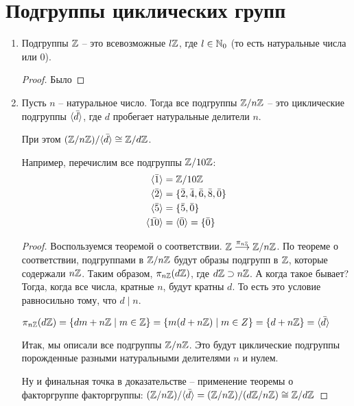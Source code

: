 \section{Подгруппы циклических групп}
\begin{enumerate}
    \item Подгруппы $\mathbb{Z}$ -- это всевозможные $l \mathbb{Z}$, где $l \in \mathbb{N}_0$ (то есть натуральные числа или 0). 
    \begin{proof}
        Было
    \end{proof}
    \item Пусть $n$ -- натуральное число. Тогда все подгруппы $\mathbb{Z} / n\mathbb{Z}$ -- это циклические подгруппы $\langle \bar d \rangle$, 
    где $d$ пробегает натуральные делители $n$. 
    
    При этом $(\mathbb{Z}/ n\mathbb{Z})/ \langle \bar d \rangle \cong \mathbb{Z}/d\mathbb{Z}$. 
    
    Например, перечислим все подгруппы $\mathbb{Z}/10\mathbb{Z}$: 
    \begin{align*}
        \langle \bar 1 \rangle &= \mathbb{Z}/ 10 \mathbb{Z} \\
        \langle \bar 2 \rangle &= \{\bar 2, \bar 4, \bar 6, \bar 8, \bar 0\} \\
        \langle \bar 5 \rangle &= \{\bar 5, \bar 0\} \\
        \langle \bar{10} \rangle &= \langle \bar 0 \rangle = \{\bar 0\} \\
    \end{align*}
    \begin{proof}
        Воспользуемся теоремой о соответствии. $\mathbb{Z}  \overset{\pi_{n\mathbb{Z}}}{\longrightarrow} \mathbb{Z}/ n\mathbb{Z}$. По теореме о соответствии, 
        подгруппами в $\mathbb{Z}/ n\mathbb{Z}$ будут образы подгрупп в $\mathbb{Z}$, которые содержали $n\mathbb{Z}$. Таким образом, $\pi_{n\mathbb{Z}}(d\mathbb{Z})$, где 
        $d\mathbb{Z} \supset n\mathbb{Z}$. А когда такое бывает? Тогда, когда все числа, кратные $n$, будут кратны $d$. То есть это условие 
        равносильно тому, что $d \mid n$.

        $\pi_{n\mathbb{Z}}(d\mathbb{Z}) = \{dm + n\mathbb{Z}\mid m \in \mathbb{Z}\} = \{m (d + n\mathbb{Z})\mid m \in Z\} = \{d + n\mathbb{Z}\} = \langle \bar d \rangle$

        Итак, мы описали все подгруппы $\mathbb{Z}/ n\mathbb{Z}$. Это будут циклические подгруппы порожденные разными натуральными 
        делителями $n$ и нулем. 

        Ну и финальная точка в доказательстве -- применение теоремы о факторгруппе факторгруппы: $(\mathbb{Z}/n\mathbb{Z})/\langle \bar d \rangle = (\mathbb{Z}/n\mathbb{Z})/(d\mathbb{Z}/ n\mathbb{Z}) \cong \mathbb{Z}/d\mathbb{Z}$
    \end{proof}
\end{enumerate}

